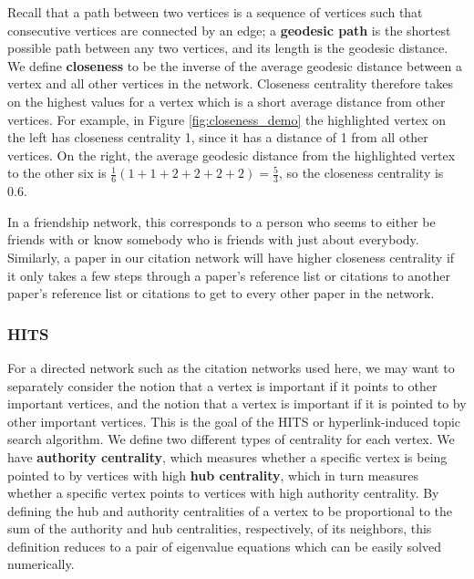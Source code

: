\documentclass[12pt]{thesis}
\theoremstyle{plain}
\theoremstyle{definition}
\theoremstyle{remark}
\begin{document}
Recall that a path between two vertices is a sequence of vertices such that consecutive vertices are connected by an edge; a \textbf{geodesic path} is the shortest possible path between any two vertices, and its length is the geodesic distance. We define \textbf{closeness} to be the inverse of the average geodesic distance between a vertex and all other vertices in the network. Closeness centrality therefore takes on the highest values for a vertex which is a short average distance from other vertices. For example, in Figure \ref{fig:closeness_demo} the highlighted vertex on the left has closeness centrality 1, since it has a distance of 1 from all other vertices. On the right, the average geodesic distance from the highlighted vertex to the other six is $\frac{1}{6}(1+1+2+2+2+2)=\frac{5}{3}$, so the closeness centrality is 0.6.

In a friendship network, this corresponds to a person who seems to either be friends with or know somebody who is friends with just about everybody. Similarly, a paper in our citation network will have higher closeness centrality if it only takes a few steps through a paper's reference list or citations to another paper's reference list or citations to get to every other paper in the network. 


\subsubsection{HITS}
For a directed network such as the citation networks used here, we may want to separately consider the notion that a vertex is important if it points to other important vertices, and the notion that a vertex is important if it is pointed to by other important vertices. This is the goal of the HITS or hyperlink-induced topic search algorithm.  We define two different types of centrality for each vertex. We have \textbf{authority centrality}, which measures whether a specific vertex is being pointed to by vertices with high \textbf{hub centrality}, which in turn measures whether a  specific vertex points to vertices with high authority centrality. By defining the hub and authority centralities of a vertex to be proportional to the sum of the authority and hub centralities, respectively, of its neighbors, this definition reduces to a pair of eigenvalue equations which can be easily solved numerically.
\end{document}
